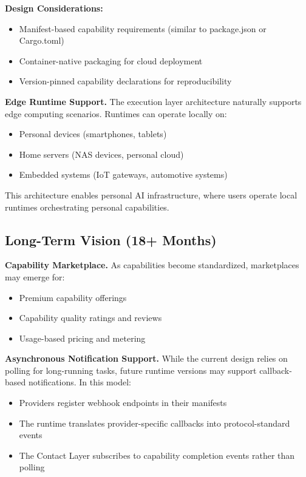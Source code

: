 \textbf{Design Considerations:}
\begin{itemize}
    \item Manifest-based capability requirements (similar to package.json or Cargo.toml)
    \item Container-native packaging for cloud deployment
    \item Version-pinned capability declarations for reproducibility
\end{itemize}

\textbf{Edge Runtime Support.} The execution layer architecture naturally supports edge computing scenarios. Runtimes can operate locally on:
\begin{itemize}
    \item Personal devices (smartphones, tablets)
    \item Home servers (NAS devices, personal cloud)
    \item Embedded systems (IoT gateways, automotive systems)
\end{itemize}

This architecture enables personal AI infrastructure, where users operate local runtimes orchestrating personal capabilities.

\subsection{Long-Term Vision (18+ Months)}

\textbf{Capability Marketplace.} As capabilities become standardized, marketplaces may emerge for:
\begin{itemize}
    \item Premium capability offerings
    \item Capability quality ratings and reviews
    \item Usage-based pricing and metering
\end{itemize}

\textbf{Asynchronous Notification Support.} While the current design relies on polling for long-running tasks, future runtime versions may support callback-based notifications. In this model:
\begin{itemize}
    \item Providers register webhook endpoints in their manifests
    \item The runtime translates provider-specific callbacks into protocol-standard events
    \item The Contact Layer subscribes to capability completion events rather than polling
\end{itemize}

